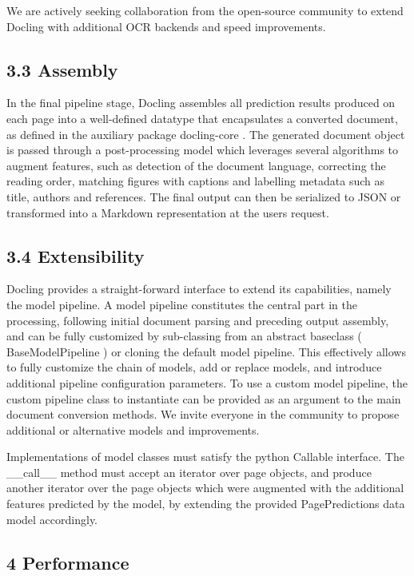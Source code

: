 We are actively seeking collaboration from the open-source community to extend Docling with additional OCR backends and speed improvements.

\subsection{3.3 Assembly}

In the final pipeline stage, Docling assembles all prediction results produced on each page into a well-defined datatype that encapsulates a converted document, as defined in the auxiliary package docling-core . The generated document object is passed through a post-processing model which leverages several algorithms to augment features, such as detection of the document language, correcting the reading order, matching figures with captions and labelling metadata such as title, authors and references. The final output can then be serialized to JSON or transformed into a Markdown representation at the users request.

\subsection{3.4 Extensibility}

Docling provides a straight-forward interface to extend its capabilities, namely the model pipeline. A model pipeline constitutes the central part in the processing, following initial document parsing and preceding output assembly, and can be fully customized by sub-classing from an abstract baseclass ( BaseModelPipeline ) or cloning the default model pipeline. This effectively allows to fully customize the chain of models, add or replace models, and introduce additional pipeline configuration parameters. To use a custom model pipeline, the custom pipeline class to instantiate can be provided as an argument to the main document conversion methods. We invite everyone in the community to propose additional or alternative models and improvements.

Implementations of model classes must satisfy the python Callable interface. The \_\_call\_\_ method must accept an iterator over page objects, and produce another iterator over the page objects which were augmented with the additional features predicted by the model, by extending the provided PagePredictions data model accordingly.

\subsection{4 Performance}

